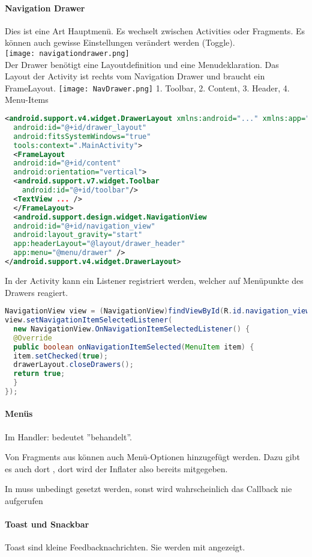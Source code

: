 \paragraph{Navigation Drawer} Dies ist eine Art Hauptmenü. Es wechselt zwischen Activities oder Fragments. Es können auch gewisse Einstellungen verändert werden (Toggle). \\
\texttt{[image: navigationdrawer.png]} \\
Der Drawer benötigt eine Layoutdefinition und eine Menudeklaration. Das Layout der Activity ist rechts vom Navigation Drawer und braucht ein FrameLayout.
\texttt{[image: NavDrawer.png]}
1. Toolbar, 2. Content, 3. Header, 4. Menu-Items
\begin{lstlisting}[language=xml]
<android.support.v4.widget.DrawerLayout xmlns:android="..." xmlns:app="..." xmlns:tools="..."
  android:id="@+id/drawer_layout"
  android:fitsSystemWindows="true"
  tools:context=".MainActivity">
  <FrameLayout
  android:id="@+id/content"
  android:orientation="vertical">
  <android.support.v7.widget.Toolbar
    android:id="@+id/toolbar"/>
  <TextView ... />
  </FrameLayout>
  <android.support.design.widget.NavigationView
  android:id="@+id/navigation_view"
  android:layout_gravity="start"
  app:headerLayout="@layout/drawer_header"
  app:menu="@menu/drawer" />
</android.support.v4.widget.DrawerLayout>
\end{lstlisting}
In der Activity kann ein Listener registriert werden, welcher auf Menüpunkte des Drawers reagiert.
\begin{lstlisting}[language=java]
NavigationView view = (NavigationView)findViewById(R.id.navigation_view);
view.setNavigationItemSelectedListener(
  new NavigationView.OnNavigationItemSelectedListener() {
  @Override
  public boolean onNavigationItemSelected(MenuItem item) {
  item.setChecked(true);
  drawerLayout.closeDrawers();
  return true;
  }
});
\end{lstlisting}

\paragraph{Menüs}
Im Handler:  bedeutet ''behandelt''.

Von Fragments aus können auch Menü-Optionen hinzugefügt werden. Dazu gibt es auch dort , dort wird der Inflater also bereits mitgegeben.

In  muss unbedingt  gesetzt werden, sonst wird wahrscheinlich das Callback nie aufgerufen
\paragraph{Toast und Snackbar} Toast sind kleine Feedbacknachrichten. Sie werden mit  angezeigt.